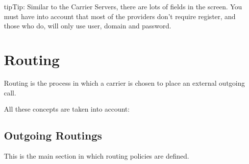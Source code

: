 \documentclass[letterpaper,10pt,english]{sphinxmanual}
\begin{document}
\begin{notice}{tip}{Tip:}
Similar to the Carrier Servers, there are lots of fields in the screen.
You must have into account that most of the providers don't require register,
and those who do, will only use user, domain and password.
\end{notice}


\section{Routing}
\label{administration_portal/brand/routing/index::doc}\label{administration_portal/brand/routing/index:routing}
Routing is the process in which a carrier is chosen to place an external outgoing call.

All these concepts are taken into account:


\subsection{Outgoing Routings}
\label{administration_portal/brand/routing/outgoing_routings:routes-weights}\label{administration_portal/brand/routing/outgoing_routings::doc}\label{administration_portal/brand/routing/outgoing_routings:outgoing-routings}
This is the main section in which routing policies are defined.
\end{document}
